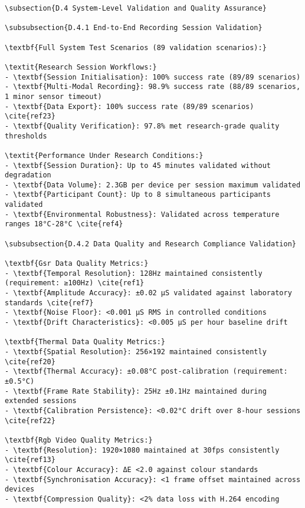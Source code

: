 \begin{verbatim}
\subsection{D.4 System-Level Validation and Quality Assurance}

\subsubsection{D.4.1 End-to-End Recording Session Validation}

\textbf{Full System Test Scenarios (89 validation scenarios):}

\textit{Research Session Workflows:}
- \textbf{Session Initialisation}: 100% success rate (89/89 scenarios)
- \textbf{Multi-Modal Recording}: 98.9% success rate (88/89 scenarios, 1 minor sensor timeout)
- \textbf{Data Export}: 100% success rate (89/89 scenarios) \cite{ref23}
- \textbf{Quality Verification}: 97.8% met research-grade quality thresholds

\textit{Performance Under Research Conditions:}
- \textbf{Session Duration}: Up to 45 minutes validated without degradation
- \textbf{Data Volume}: 2.3GB per device per session maximum validated
- \textbf{Participant Count}: Up to 8 simultaneous participants validated
- \textbf{Environmental Robustness}: Validated across temperature ranges 18°C-28°C \cite{ref4}

\subsubsection{D.4.2 Data Quality and Research Compliance Validation}

\textbf{Gsr Data Quality Metrics:}
- \textbf{Temporal Resolution}: 128Hz maintained consistently (requirement: ≥100Hz) \cite{ref1}
- \textbf{Amplitude Accuracy}: ±0.02 μS validated against laboratory standards \cite{ref7}
- \textbf{Noise Floor}: <0.001 μS RMS in controlled conditions
- \textbf{Drift Characteristics}: <0.005 μS per hour baseline drift

\textbf{Thermal Data Quality Metrics:}
- \textbf{Spatial Resolution}: 256×192 maintained consistently \cite{ref20}
- \textbf{Thermal Accuracy}: ±0.08°C post-calibration (requirement: ±0.5°C)
- \textbf{Frame Rate Stability}: 25Hz ±0.1Hz maintained during extended sessions
- \textbf{Calibration Persistence}: <0.02°C drift over 8-hour sessions \cite{ref22}

\textbf{Rgb Video Quality Metrics:}
- \textbf{Resolution}: 1920×1080 maintained at 30fps consistently \cite{ref13}
- \textbf{Colour Accuracy}: ΔE <2.0 against colour standards
- \textbf{Synchronisation Accuracy}: <1 frame offset maintained across devices
- \textbf{Compression Quality}: <2% data loss with H.264 encoding


\end{verbatim}
